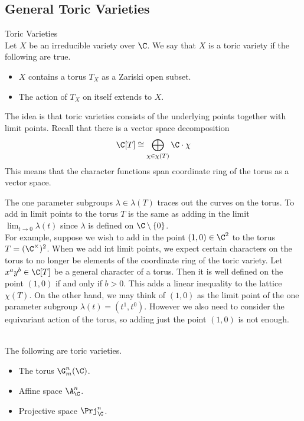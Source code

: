 \documentclass[a4paper]{article}
\begin{document}
\subsection{General Toric Varieties}
\begin{defn}{Toric Varieties}{}\\
Let $X$ be an irreducible variety over $\C$. We say that $X$ is a toric variety if the following are true. 
\begin{itemize}
\item $X$ contains a torus $T_X$ as a Zariski open subset. 
\item The action of $T_X$ on itself extends to $X$. 
\end{itemize}
\end{defn}

The idea is that toric varieties consists of the underlying points together with limit points. Recall that there is a vector space decomposition $$\C[T]\cong\bigoplus_{\chi\in\chi(T)}\C\cdot\chi$$ This means that the character functions span coordinate ring of the torus as a vector space. 

The one parameter subgroups $\lambda\in\lambda(T)$ traces out the curves on the torus. To add in limit points to the torus $T$ is the same as adding in the limit $\lim_{t\to 0}\lambda(t)$ since $\lambda$ is defined on $\C\setminus\{0\}$. \\

For example, suppose we wish to add in the point $(1,0)\in\C^2$ to the torus $T=(\C^\times)^2$. When we add int limit points, we expect certain characters on the torus to no longer be elements of the coordinate ring of the toric variety. Let $x^ay^b\in\C[T]$ be a general character of a torus. Then it is well defined on the point $(1,0)$ if and only if $b>0$. This adds a linear inequality to the lattice $\chi(T)$. On the other hand, we may think of $(1,0)$ as the limit point of the one parameter subgroup $\lambda(t)=(t^1,t^0)$. However we also need to consider the equivariant action of the torus, so adding just the point $(1,0)$ is not enough. 

\begin{eg}{}{}\\
The following are toric varieties. 
\begin{itemize}
\item The torus $\G_m^n(\C)$. 
\item Affine space $\A_\C^n$. 
\item Projective space $\Prj_\C^n$. 
\end{itemize}
\end{eg}
\end{document}

